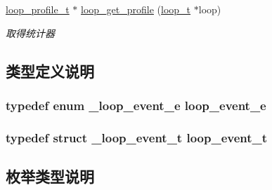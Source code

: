 \begin{DoxyCompactItemize}
\hyperlink{a00050_ad060e1396346d2f5db1ec0597376a107_ad060e1396346d2f5db1ec0597376a107}{loop\+\_\+profile\+\_\+t} $\ast$ \hyperlink{a00104_gad3f87700814d56a619ab5517b1f5fe5b_gad3f87700814d56a619ab5517b1f5fe5b}{loop\+\_\+get\+\_\+profile} (\hyperlink{a00050_a9c3ad1cd2de83e09f3a7b59fa82c94ee_a9c3ad1cd2de83e09f3a7b59fa82c94ee}{loop\+\_\+t} $\ast$loop)
\begin{DoxyCompactList}\small\item\em 取得统计器 \end{DoxyCompactList}\end{DoxyCompactItemize}


\subsection{类型定义说明}
\hypertarget{a00068_ab92fe4e788615cfd56530167651a8ff4_ab92fe4e788615cfd56530167651a8ff4}{}
\subsubsection[{loop\+\_\+event\+\_\+e}]{\setlength{\rightskip}{0pt plus 5cm}typedef enum {\bf \+\_\+loop\+\_\+event\+\_\+e}  {\bf loop\+\_\+event\+\_\+e}}\label{a00068_ab92fe4e788615cfd56530167651a8ff4_ab92fe4e788615cfd56530167651a8ff4}
\hypertarget{a00068_a1095ee772017ce29dcac0987c456709e_a1095ee772017ce29dcac0987c456709e}{}
\subsubsection[{loop\+\_\+event\+\_\+t}]{\setlength{\rightskip}{0pt plus 5cm}typedef struct {\bf \+\_\+loop\+\_\+event\+\_\+t}  {\bf loop\+\_\+event\+\_\+t}}\label{a00068_a1095ee772017ce29dcac0987c456709e_a1095ee772017ce29dcac0987c456709e}


\subsection{枚举类型说明}
\hypertarget{a00068_a19ff97cc6f736cb864d4e4b6ca60989d_a19ff97cc6f736cb864d4e4b6ca60989d}{}
